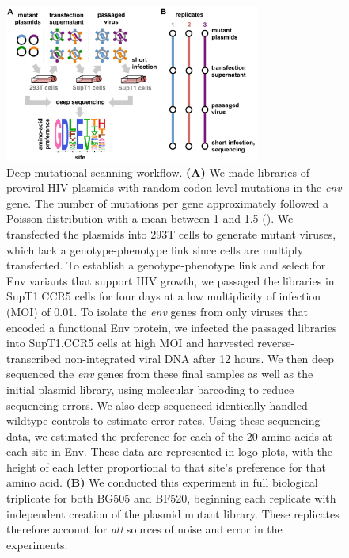 \documentclass[9pt]{elife}
\begin{document}
\begin{figure}
\centerline{\includegraphics[width=0.75\textwidth]{figures/dms_schematic/dms_schematic.pdf}}
\caption{\label{fig:dms_schematic}
Deep mutational scanning workflow.
{\bf (A)} We made libraries of proviral HIV plasmids with random codon-level mutations in the \textit{env} gene.
The number of mutations per gene approximately followed a Poisson distribution with a mean between 1 and 1.5 ().
We transfected the plasmids into 293T cells to generate mutant viruses, which lack a genotype-phenotype link since cells are multiply transfected.
To establish a genotype-phenotype link and select for Env variants that support HIV growth, we passaged the libraries in SupT1.CCR5 cells for four days at a low multiplicity of infection (MOI) of 0.01.
To isolate the \textit{env} genes from only viruses that encoded a functional Env protein, we infected the passaged libraries into SupT1.CCR5 cells at high MOI and harvested reverse-transcribed non-integrated viral DNA after 12 hours.
We then deep sequenced the \textit{env} genes from these final samples as well as the initial plasmid library, using molecular barcoding to reduce sequencing errors.
We also deep sequenced identically handled wildtype controls to estimate error rates.
Using these sequencing data, we estimated the preference for each of the 20 amino acids at each site in Env.
These data are represented in logo plots, with the height of each letter proportional to that site's preference for that amino acid.
{\bf (B)} We conducted this experiment in full biological triplicate for both BG505 and BF520, beginning each replicate with independent creation of the plasmid mutant library.
These replicates therefore account for \emph{all} sources of noise and error in the experiments.
}
\end{figure}
\end{document}
